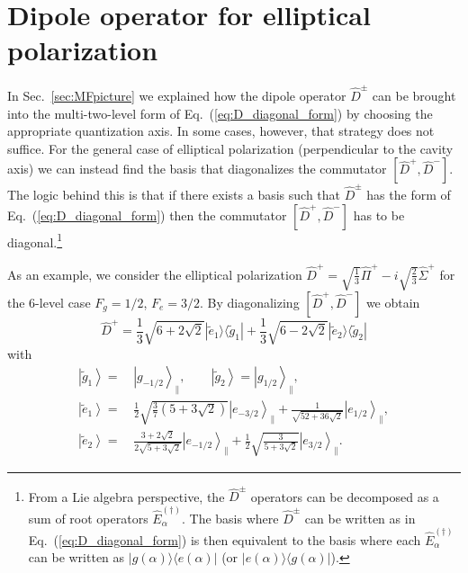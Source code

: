 \documentclass[aps,prx,superscriptaddress,twocolumn,notitlepage,nofootinbib,longbibliography]{revtex4-2}
\newcommand{\ket}[1]{\left|#1\right>}
\begin{document}

\section{Dipole operator for elliptical polarization\label{app:elliptical_pol}}


In Sec.~\ref{sec:MFpicture} we explained how the dipole operator $\hat{D}^\pm$ can be brought into the multi-two-level form of Eq.~(\ref{eq:D_diagonal_form}) by choosing the appropriate quantization axis. In some cases, however, that strategy does not suffice. For the general case of elliptical polarization (perpendicular to the cavity axis) we can instead find the basis that diagonalizes the commutator $[\hat{D}^+,\hat{D}^-]$. The logic behind this is that if there exists a basis such that $\hat{D}^\pm$ has the form of Eq.~(\ref{eq:D_diagonal_form}) then the commutator $[\hat{D}^+,\hat{D}^-]$ has to be diagonal.\footnote{From a Lie algebra perspective, the $\hat{D}^\pm$ operators can be decomposed as a sum of root operators $\hat{E}^{(\dagger)}_\alpha$. The basis where $\hat{D}^\pm$ can be written as in Eq.~(\ref{eq:D_diagonal_form}) is then equivalent to the basis where each $\hat{E}^{(\dagger)}_\alpha$ can be written as $| g(\alpha) \rangle\langle e(\alpha) |$ (or $| e(\alpha) \rangle\langle g(\alpha) |$).} 

As an example, we consider the elliptical polarization $\hat{D}^+ = \sqrt{\frac{1}{3}} \hat{\Pi}^+ - i \sqrt{\frac{2}{3}} \hat{\Sigma}^+$ for the 6-level case $F_g=1/2$, $F_e=3/2$. By diagonalizing $[\hat{D}^+,\hat{D}^-]$ we obtain
\begin{equation}
    \hat{D}^+ = \frac{1}{3} \sqrt{6+2\sqrt{2}} | \tilde{e}_1 \rangle\langle \tilde{g}_1 | + \frac{1}{3} \sqrt{6-2\sqrt{2}} | \tilde{e}_2 \rangle\langle \tilde{g}_2 |
\end{equation}
with
\begin{align}
    \ket{\tilde{g}_1} =&\, \ket{g_{-1/2}}_\parallel, \qquad
    \ket{\tilde{g}_2} = \ket{g_{1/2}}_\parallel, \\
    \ket{\tilde{e}_1} =&\, \frac{1}{2} \sqrt{\frac{3}{7}(5+3\sqrt{2})} \ket{e_{-3/2}}_\parallel + \frac{1}{\sqrt{52+36\sqrt{2}}} \ket{e_{1/2}}_\parallel, \\
    \ket{\tilde{e}_2} =&\, \frac{3+2\sqrt{2}}{2\sqrt{5+3\sqrt{2}}} \ket{e_{-1/2}}_\parallel +  \frac{1}{2} \sqrt{\frac{3}{5+3\sqrt{2}}} \ket{e_{3/2}}_\parallel .
\end{align}
\end{document}

